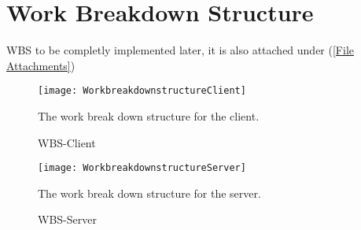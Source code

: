 \section{Work Breakdown Structure}\label{Work Breakdown Structure}
    WBS to be completly implemented later, it is also attached under (\ref{File Attachments})
    
        \begin{figure}[htb]
            \centering
            \texttt{[image: WorkbreakdownstructureClient]}
            \caption{WBS-Client}
            The work break down structure for the client.
            \label{fig:WorkbreakdownstructureClient}
        \end{figure}
        
        \begin{figure}[hbt]
            \centering
            \texttt{[image: WorkbreakdownstructureServer]}
            \caption{WBS-Server}
            The work break down structure for the server.
            \label{fig:WorkbreakdownstructureServer}
        \end{figure}
